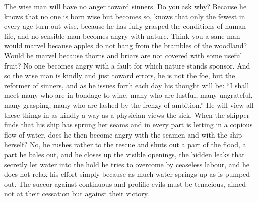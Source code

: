 The wise man will have no anger toward sinners. Do you ask why?
Because he knows that no one is born wise but becomes so, knows that
only the fewest in every age turn out wise, because he has fully
grasped the conditions of human life, and no sensible man becomes
angry with nature. Think you a sane man would marvel because apples do
not hang from  the brambles of the woodland? Would he marvel
because thorns and briars are not covered with some useful fruit? No
one becomes angry with a fault for which nature stands sponsor. And so
the wise man is kindly and just toward errors, he is not the foe, but
the reformer of sinners, and as he issues forth each day his thought
will be: ``I shall meet many who are in bondage to wine, many who are
lustful, many ungrateful, many grasping, many who are lashed by the
frenzy of ambition.'' He will view all these things in as kindly a way
as a physician views the sick. When the skipper finds that his ship
has sprung her seams and in every part is letting in a copious flow of
water, does he then become angry with the seamen and with the ship
herself? No, he rushes rather to the rescue and shuts out a part of
the flood, a part he bales out, and he closes up the visible openings,
the hidden leaks that secretly let water into the hold he tries to
overcome by ceaseless labour, and he does not relax his effort simply
because as much water springs up as is pumped out. The succor against
continuous and prolific evils must be tenacious, aimed not at their
cessation but against their victory.

